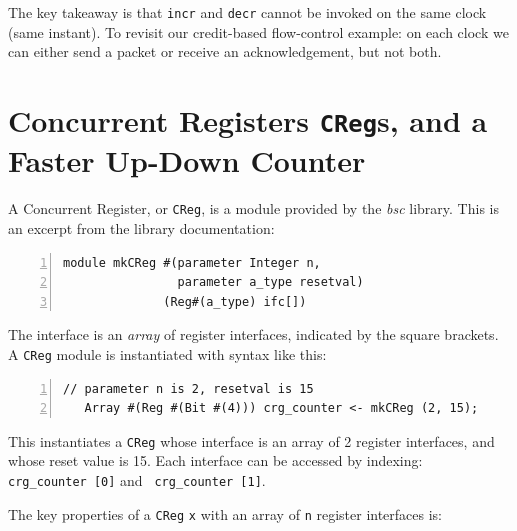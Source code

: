 The key takeaway is that \verb|incr| and \verb|decr| cannot be invoked
on the same clock (same instant).  To revisit our credit-based
flow-control example: on each clock we can either send a packet or
receive an acknowledgement, but not both.


\section{Concurrent Registers {\tt CReg}s, and a Faster Up-Down Counter}

\label{Sec_CRegs}

A Concurrent Register, or \verb|CReg|, is a module provided by the
\emph{bsc} library.  This is an excerpt from the library documentation:

{\footnotesize
\begin{Verbatim}[frame=single, numbers=left]
module mkCReg #(parameter Integer n,
                parameter a_type resetval)
              (Reg#(a_type) ifc[])
\end{Verbatim}
}

The interface is an \emph{array} of register interfaces, indicated by
the square brackets.  A \verb|CReg| module is instantiated with syntax
like this:

{\footnotesize
\begin{Verbatim}[frame=single, numbers=left]
   // parameter n is 2, resetval is 15
   Array #(Reg #(Bit #(4))) crg_counter <- mkCReg (2, 15);
\end{Verbatim}
}

This instantiates a \verb|CReg| whose interface is an array of 2
register interfaces, and whose reset value is 15.  Each interface can
be accessed by indexing: {\tt crg\_counter~[0]} and {\tt
crg\_counter~[1]}.

The key properties of a \verb|CReg| \verb|x| with an array of \verb|n|
register interfaces is:


